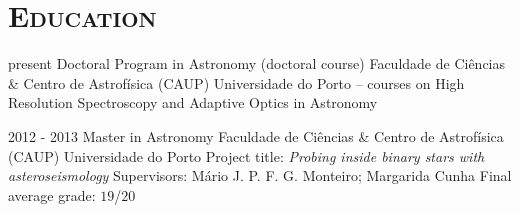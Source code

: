 \documentclass[10pt]{moderncv}
\begin{document}
%




\section{\textsc{Education}}

\cventry
	{present}
	{Doctoral Program in Astronomy (doctoral course)}
	{\newline Faculdade de Ciências \& Centro de Astrofísica (CAUP)}
	{Universidade do Porto}
	{\newline 
	-- courses on High Resolution Spectroscopy and Adaptive Optics in Astronomy}
	{}  %


\cventry
	{2012 - 2013}
	{Master in Astronomy}
	{\newline Faculdade de Ciências \& Centro de Astrofísica (CAUP)}
	{Universidade do Porto}
	{\newline Project title: \emph{Probing inside binary stars with asteroseismology}
	\newline
	Supervisors: Mário J. P. F. G. Monteiro; Margarida Cunha}
	{Final average grade: $19$/$20$}  %


\end{document}
